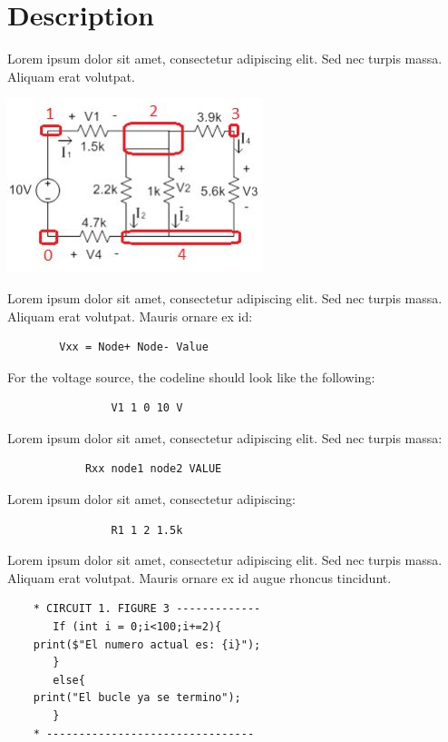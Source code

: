 \documentclass[article]{IEEEtran}
\begin{document}
\section*{Description}
Lorem ipsum dolor sit amet, consectetur adipiscing elit. Sed nec turpis massa. Aliquam erat volutpat. 

\begin{center}
    \includegraphics[scale=0.7]{fig4.JPG}
\end{center}
Lorem ipsum dolor sit amet, consectetur adipiscing elit. Sed nec turpis massa. Aliquam erat volutpat. Mauris ornare ex id:
\begin{center}
\begin{verbatim}
        Vxx = Node+ Node- Value
\end{verbatim}
\end{center}
For the voltage source, the codeline should look like the following:

\begin{verbatim}
                V1 1 0 10 V
\end{verbatim}

Lorem ipsum dolor sit amet, consectetur adipiscing elit. Sed nec turpis massa:

\begin{verbatim}
            Rxx node1 node2 VALUE
\end{verbatim}

Lorem ipsum dolor sit amet, consectetur adipiscing:

\begin{verbatim}
                R1 1 2 1.5k
\end{verbatim}

Lorem ipsum dolor sit amet, consectetur adipiscing elit. Sed nec turpis massa. Aliquam erat volutpat. Mauris ornare ex id augue rhoncus tincidunt.

\begin{verbatim}
    * CIRCUIT 1. FIGURE 3 -------------
       If (int i = 0;i<100;i+=2){
    print($"El numero actual es: {i}");
       }
       else{
    print("El bucle ya se termino");
       }
    * --------------------------------
\end{verbatim}
\end{document}
